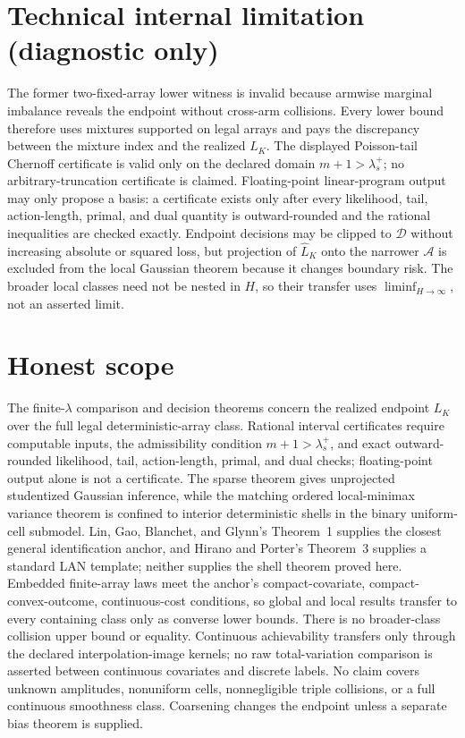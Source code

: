 \documentclass{article}
\begin{document}
\section*{Technical internal limitation (diagnostic only)}

The former two-fixed-array lower witness is invalid because armwise marginal imbalance reveals the endpoint without cross-arm collisions. Every lower bound therefore uses mixtures supported on legal arrays and pays the discrepancy between the mixture index and the realized \(L_K\). The displayed Poisson-tail Chernoff certificate is valid only on the declared domain \(m+1>\lambda_s^+\); no arbitrary-truncation certificate is claimed. Floating-point linear-program output may only propose a basis: a certificate exists only after every likelihood, tail, action-length, primal, and dual quantity is outward-rounded and the rational inequalities are checked exactly. Endpoint decisions may be clipped to \(\mathcal D\) without increasing absolute or squared loss, but projection of \(\widehat L_K\) onto the narrower \(\mathcal A\) is excluded from the local Gaussian theorem because it changes boundary risk. The broader local classes need not be nested in \(H\), so their transfer uses \(\liminf_{H\to\infty}\), not an asserted limit.

\section{Honest scope}

The finite-\(\lambda\) comparison and decision theorems concern the realized endpoint \(L_K\) over the full legal deterministic-array class. Rational interval certificates require computable inputs, the admissibility condition \(m+1>\lambda_s^+\), and exact outward-rounded likelihood, tail, action-length, primal, and dual checks; floating-point output alone is not a certificate. The sparse theorem gives unprojected studentized Gaussian inference, while the matching ordered local-minimax variance theorem is confined to interior deterministic shells in the binary uniform-cell submodel. Lin, Gao, Blanchet, and Glynn's Theorem~1 supplies the closest general identification anchor, and Hirano and Porter's Theorem~3 supplies a standard LAN template; neither supplies the shell theorem proved here. Embedded finite-array laws meet the anchor's compact-covariate, compact-convex-outcome, continuous-cost conditions, so global and local results transfer to every containing class only as converse lower bounds. There is no broader-class collision upper bound or equality. Continuous achievability transfers only through the declared interpolation-image kernels; no raw total-variation comparison is asserted between continuous covariates and discrete labels. No claim covers unknown amplitudes, nonuniform cells, nonnegligible triple collisions, or a full continuous smoothness class. Coarsening changes the endpoint unless a separate bias theorem is supplied.
\end{document}
